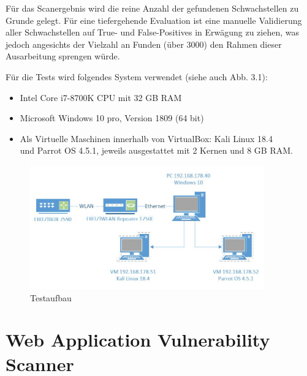 \documentclass[12pt,oneside,a4paper,parskip,pointlessnumbers]{scrbook}
\begin{document}
   Für das Scanergebnis wird die reine Anzahl der gefundenen Schwachstellen zu Grunde gelegt. Für eine tiefergehende Evaluation ist eine manuelle Validierung aller Schwachstellen auf True- und False-Positives in Erwägung zu ziehen, was jedoch angesichts der Vielzahl an Funden (über 3000) den Rahmen dieser Ausarbeitung sprengen würde.

  Für die Tests wird folgendes System verwendet (siehe auch Abb. 3.1):
  \begin{itemize}
    \item Intel Core i7-8700K CPU mit 32 GB RAM
    \item Microsoft Windows 10 pro, Version 1809 (64 bit)
    \item Als Virtuelle Maschinen innerhalb von VirtualBox: Kali Linux 18.4 \\
    und Parrot OS 4.5.1, jeweils ausgestattet mit 2 Kernen und 8 GB RAM.
  \end{itemize}
  \vspace{20pt}
  \begin{figure}[H]
    \centering
    \includegraphics[width=0.9\textwidth]{Images/Visio}
    \caption[Testaufbau]{Testaufbau}
  \end{figure}
  \vspace{20pt}
\section{Web Application Vulnerability Scanner}
\end{document}
